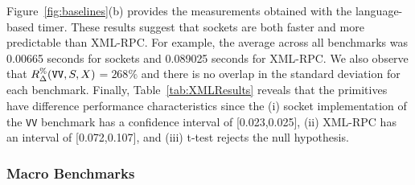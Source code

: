 \documentclass{sig-alternate}
\begin{document}


\sloppy Figure~\ref{fig:baselines}(b) provides the measurements
obtained with the language-based timer.  These results suggest that
sockets are both faster and more predictable than XML-RPC.  For
example, the average across all benchmarks was 0.00665 seconds for
sockets and 0.089025 seconds for XML-RPC.  We also observe that
{\small $R_\Delta^\%(\mbox{{\tt VV}},S,X)$}$=268\%$ and there is no
overlap in the standard deviation for each benchmark.  Finally,
Table~\ref{tab:XMLResults} reveals that the primitives have difference
performance characteristics since the (i) socket implementation of the
\texttt{VV} benchmark has a confidence interval of [0.023,0.025], (ii)
XML-RPC has an interval of [0.072,0.107], and (iii) t-test rejects the
null hypothesis.


\vspace*{-.1in}
\subsubsection{Macro Benchmarks}




\end{document}
